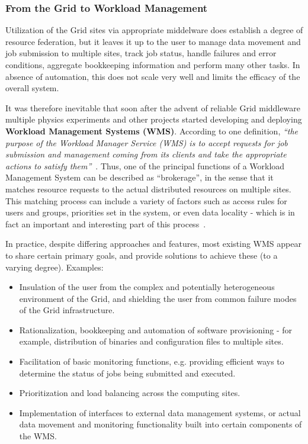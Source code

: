 \subsubsection{From the Grid to Workload Management}
\label{from_grid_to_workload}
Utilization of the Grid sites via appropriate middelware does establish a degree of resource federation, but it leaves it up to the user to manage data movement and job submission to multiple sites,
track job status, handle failures and error conditions, aggregate bookkeeping information and perform many other tasks. In absence of automation, this does not scale very well and limits the efficacy
of the overall system.

It was therefore inevitable that soon after the advent of reliable Grid middleware multiple physics experiments and other projects started developing and deploying \textbf{Workload Management Systems (WMS)}.
 According to one definition,
\textit{``the purpose of the Workload Manager Service (WMS) is to accept requests for job submission and management coming from its clients and take the appropriate actions to satisfy them''}~\cite{egee_user_guide}.
Thus, one of the principal functions of a Workload Management System can be described as ``brokerage'', in the sense that it matches resource requests to the actual distributed resources
on multiple sites. This matching process can include a variety of factors such as access rules for users and groups, priorities set in the system, or even data locality - which is in fact an important and interesting part of this process~\cite{panda_chep10}.

In practice, despite differing approaches and features, most existing WMS appear to share certain primary goals, and provide solutions to achieve these (to a varying degree). Examples:

\begin{itemize}

\item Insulation of the user from the complex and potentially heterogeneous environment of the Grid, and shielding the user from common failure modes of the Grid infrastructure.

\item Rationalization, bookkeeping and automation of software provisioning - for example, distribution of binaries and configuration files to multiple sites.

\item Facilitation of basic monitoring functions, e.g. providing efficient ways to determine the status of jobs being submitted and executed.

\item Prioritization and load balancing across the computing sites.

\item Implementation of interfaces to external data management systems, or actual data movement and monitoring functionality built into certain components of the WMS.

\end{itemize}

